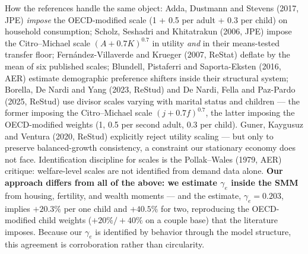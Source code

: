 \documentclass[10pt]{article}
\begin{document}
How the references handle the same object: Adda, Dustmann and Stevens
(2017, JPE) \emph{impose} the OECD-modified scale (1 + 0.5 per adult +
0.3 per child) on household consumption; Scholz, Seshadri and
Khitatrakun (2006, JPE) impose the Citro--Michael scale
$(A+0.7K)^{0.7}$ in utility \emph{and} in their means-tested transfer
floor; Fern\'andez-Villaverde and Krueger (2007, ReStat) deflate by the
mean of six published scales; Blundell, Pistaferri and Saporta-Eksten
(2016, AER) estimate demographic preference shifters inside their
structural system; Borella, De Nardi and Yang (2023, ReStud) and
De Nardi, Fella and Paz-Pardo (2025, ReStud) use divisor scales
varying with marital status and children --- the former imposing the
Citro--Michael scale $(j+0.7f)^{0.7}$, the latter imposing the
OECD-modified weights (1, 0.5 per second adult, 0.3 per child).
Guner, Kaygusuz and Ventura (2020, ReStud) explicitly
reject utility scaling --- but only to preserve balanced-growth
consistency, a constraint our stationary economy does not face.
Identification discipline for scales is the Pollak--Wales (1979, AER)
critique: welfare-level scales are not identified from demand data alone.
\textbf{Our approach differs from all of the above: we estimate
$\gamma_e$ inside the SMM} from housing, fertility, and wealth moments
--- and the estimate, $\gamma_e = 0.203$, implies $+20.3\%$ per one child
and $+40.5\%$ for two, reproducing the OECD-modified child weights
($+20\%/+40\%$ on a couple base) that the literature imposes. Because our
$\gamma_e$ is identified by behavior through the model structure, this
agreement is corroboration rather than circularity.
\end{document}
